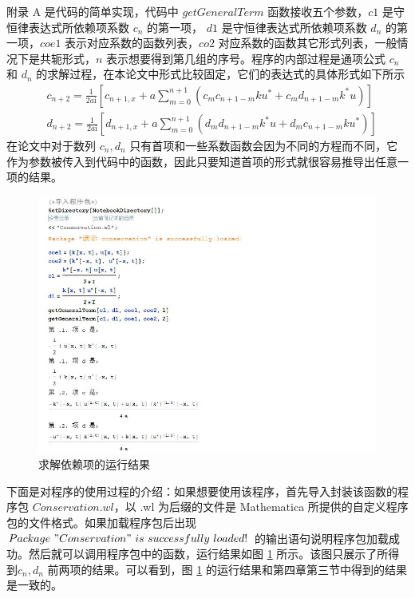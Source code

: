 附录 A 是代码的简单实现，代码中 $getGeneralTerm$ 函数接收五个参数，$c1$ 是守恒律表达式所依赖项系数 $c_n$ 的第一项， $d1$ 是守恒律表达式所依赖项系数 $d_n$ 的第一项，$coe1$ 表示对应系数的函数列表，$co2$ 对应系数的函数其它形式列表，一般情况下是共轭形式，$n$ 表示想要得到第几组的序号。程序的内部过程是通项公式 $c_n$ 和 $d_n$ 的求解过程，在本论文中形式比较固定，它们的表达式的具体形式如下所示
\begin{align}
  & c_{n+2} = \frac{1}{2a\mathrm{i}} \left[c_{n+1,x} + a\sum_{m=0}^{n+1}(c_{m}c_{n+1-m}ku^{*} + c_{m}d_{n+1-m}k^{*}u)\right] \\
  & d_{n+2} = \frac{1}{2a\mathrm{i}} \left[ d_{n+1,x} + a\sum_{m=0}^{n+1}(d_{m}d_{n+1-m}k^{*}u + d_{m}c_{n+1-m}ku^{*}) \right]
\end{align}
在论文中对于数列 $c_n, d_n$ 只有首项和一些系数函数会因为不同的方程而不同，它作为参数被传入到代码中的函数，因此只要知道首项的形式就很容易推导出任意一项的结果。

\begin{figure}[!htp]
	\centering
	\includegraphics[width=0.97\linewidth]{getGeneralTerm.jpg}
	\caption{求解依赖项的运行结果}
	\label{picture-5-1}
\end{figure}
下面是对程序的使用过程的介绍：如果想要使用该程序，首先导入封装该函数的程序包 $Conservation.wl$，以 .wl 为后缀的文件是 Mathematica 所提供的自定义程序包的文件格式。如果加载程序包后出现 $Package \ "Conservation" \ is \ successfully \  loaded!$ 的输出语句说明程序包加载成功。然后就可以调用程序包中的函数，运行结果如图 \ref{picture-5-1} 所示。该图只展示了所得到$c_n, d_n$ 前两项的结果。可以看到，图 \ref{picture-5-1} 的运行结果和第四章第三节中得到的结果是一致的。


